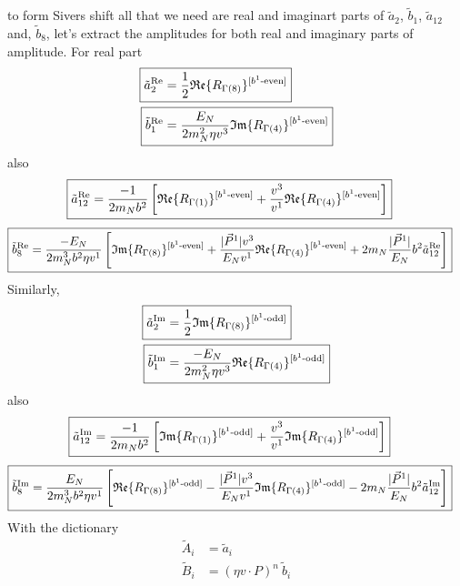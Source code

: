 \documentclass[]{article}
\numberwithin{equation}{section}
\newcommand{\tcdot}{{\cdot}}
\newcommand{\tAmp}{\widetilde{A}}
\newcommand{\tBmp}{\widetilde{B}}
\newcommand{\tAmp}{\ensuremath{\widetilde{A}^{(+)}}}
\newcommand{\tBmp}{\ensuremath{\widetilde{B}^{(+)}}}
\newcommand{\bvec}{b}
\newcommand{\mN}{m_N}
\begin{document}
to form Sivers shift all that we need are real and imaginart parts of $\tilde a_2$, $\tilde b_1$, $\tilde a_{12}$ and, $\tilde b_8$, let's extract the amplitudes for both real and imaginary parts of amplitude. For real part
\begin{align}
    \Aboxed{\tilde a^{\text{Re}}_2 = & \frac{1}{2}\mathfrak{Re}\{ R_{\Gamma(8)}\}^{[b^{1}\text{-even}]} }\\
    \Aboxed{\tilde b^{\text{Re}}_1 = & \frac{E_{N}}{2\mN^2 \eta v^3} \mathfrak{Im}\{ R_{\Gamma(4)}\}^{[b^{1}\text{-even}]}}
\end{align}
also
\begin{align}
   \Aboxed{\tilde a^{\text{Re}}_{12}=&\frac{-1}{2\mN  \bvec^2}\left[\mathfrak{Re}\{ R_{\Gamma(1)}\}^{[b^{1}\text{-even}]}+\frac{v^3}{v^1}\mathfrak{Re}\{ R_{\Gamma(4)}\}^{[b^{1}\text{-even}]}\right]}
\end{align}
\begin{align}
    \Aboxed{\tilde b^{\text{Re}}_8=&\frac{-E_N}{ 2\mN^3 \bvec^2 \eta v^1 }\left[\mathfrak{Im}\{ R_{\Gamma(8)}\}^{[b^{1}\text{-even}]}+\frac{|\vec{P}^1|v^3}{E_N v^1}\mathfrak{Re}\{ R_{\Gamma(4)}\}^{[b^{1}\text{-even}]}+ 2\mN  \frac{|\vec{P}^1|}{E_N} \bvec^2  \tilde a^{\text{Re}}_{12}\right]}
\end{align}
Similarly,  
\begin{align}
    \Aboxed{\tilde a^{\text{Im}}_2 = & \frac{1}{2}\mathfrak{Im}\{ R_{\Gamma(8)}\}^{[b^{1}\text{-odd}]} }\\
    \Aboxed{\tilde b^{\text{Im}}_1 = & \frac{-E_{N}}{2\mN^2 \eta v^3} \mathfrak{Re}\{ R_{\Gamma(4)}\}^{[b^{1}\text{-odd}]}}
\end{align}
also
\begin{align}
   \Aboxed{\tilde a^{\text{Im}}_{12}=&\frac{-1}{2\mN  \bvec^2}\left[\mathfrak{Im}\{ R_{\Gamma(1)}\}^{[b^{1}\text{-odd}]}+\frac{v^3}{v^1}\mathfrak{Im}\{ R_{\Gamma(4)}\}^{[b^{1}\text{-odd}]}\right]}
\end{align}
\begin{align}
    \Aboxed{\tilde b^{\text{Im}}_8=&\frac{E_N}{ 2\mN^3 \bvec^2 \eta v^1 }\left[\mathfrak{Re}\{ R_{\Gamma(8)}\}^{[b^{1}\text{-odd}]}-\frac{|\vec{P}^1|v^3}{E_N v^1}\mathfrak{Im}\{ R_{\Gamma(4)}\}^{[b^{1}\text{-odd}]}- 2\mN  \frac{|\vec{P}^1|}{E_N} \bvec^2  \tilde a^{\text{Im}}_{12}\right]}
\end{align}
With the dictionary 
\begin{align}
	\tAmp_i & = \tilde a_i \\
	 \tBmp_i & = (\eta v \tcdot P)^n\ \tilde b_i
\end{align}
\end{document}
